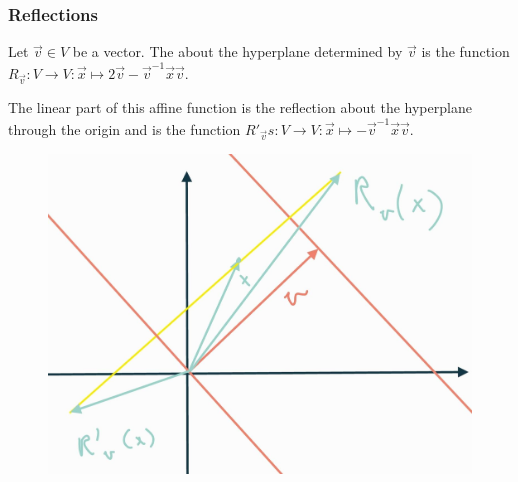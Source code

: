 \subsubsection{Reflections}
\begin{definition}
Let $\vec{v}\in V$ be a vector. The  about the hyperplane determined by $\vec{v}$ is the function $R_{\vec{v}}: V\to V: \vec{x}\mapsto 2 \vec{v} - \vec{v}^{-1}\vec{x}\vec{v}$.

The linear part of this affine function is the reflection about the hyperplane through the origin and is the function $R'_{\vec{v}}s: V\to V: \vec{x}\mapsto - \vec{v}^{-1}\vec{x}\vec{v}$.
\end{definition}

\begin{figure}[h!]
\centering
\includegraphics[width=.8\textwidth]{reflections}
\end{figure}

